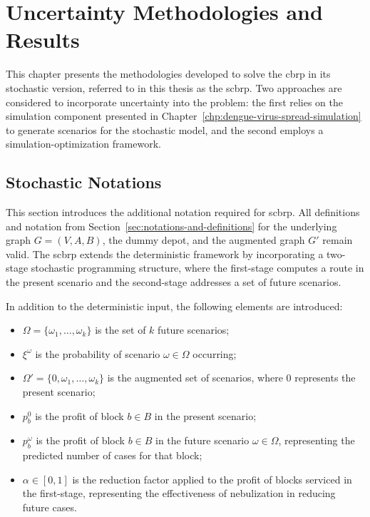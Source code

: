 \chapter{Uncertainty Methodologies and Results}\label{chp:uncertainty-methodologies-and-results}

This chapter presents the methodologies developed to solve the \gls{cbrp} in its stochastic version, referred to in this thesis as the \gls{scbrp}. Two approaches are considered to incorporate uncertainty into the problem: the first relies on the simulation component presented in Chapter~\ref{chp:dengue-virus-spread-simulation} to generate scenarios for the stochastic model, and the second employs a simulation-optimization framework.

\section{Stochastic Notations}\label{sec:stochastic-notations}

This section introduces the additional notation required for \gls{scbrp}. All definitions and notation from Section~\ref{sec:notations-and-definitions} for the underlying graph $G = (V, A, B)$, the dummy depot, and the augmented graph $G'$ remain valid. The \gls{scbrp} extends the deterministic framework by incorporating a two-stage stochastic programming structure, where the first-stage computes a route in the present scenario and the second-stage addresses a set of future scenarios.

In addition to the deterministic input, the following elements are introduced:

\begin{itemize}
	\item $\Omega = \{\omega_1, \dots, \omega_k\}$ is the set of $k$ future
	      scenarios;
	\item $\xi^{\omega}$ is the probability of scenario $\omega \in \Omega$
	      occurring;
	\item $\Omega' = \{0, \omega_1, \dots, \omega_k\}$ is the augmented set of
	      scenarios, where $0$ represents the present scenario;
	\item $p_{b}^{0}$ is the profit of block $b \in B$ in the present scenario;
	\item $p_{b}^{\omega}$ is the profit of block $b \in B$ in the future
	      scenario $\omega \in \Omega$, representing the predicted number of
	      cases for that block;
	\item $\alpha \in [0, 1]$ is the reduction factor applied to the profit of
	      blocks serviced in the first-stage, representing the effectiveness of
	      nebulization in reducing future cases.
\end{itemize}

